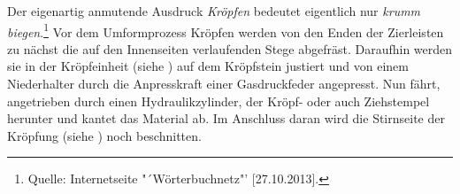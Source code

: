 \documentclass[12pt,a4paper,parskip,twoside,BCOR5mm,headsepline]{scrartcl}
\begin{document}
\begin{description*}
Der eigenartig anmutende Ausdruck \emph{Kröpfen} bedeutet eigentlich nur \emph{krumm biegen}.\footnote{Quelle: Internetseite "´Wörterbuchnetz"' [27.10.2013].}
Vor dem Umformprozess Kröpfen werden von den  Enden der Zierleisten zu nächst die auf den Innenseiten verlaufenden Stege  abgefräst.  Daraufhin werden sie in der Kröpfeinheit (siehe ) auf dem Kröpfstein justiert und von einem Niederhalter durch die Anpresskraft einer Gasdruckfeder angepresst. Nun fährt, angetrieben durch einen Hydraulikzylinder, der Kröpf- oder auch Ziehstempel herunter und kantet das Material ab. Im Anschluss daran wird die Stirnseite der Kröpfung (siehe ) noch beschnitten.
\begin{figure}[hbtp]
\centering
\hfill
{}

\end{figure}
\end{description*}
\end{document}
